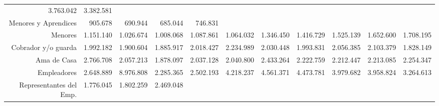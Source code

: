 \begin{tabular}{lllllllllll}
  \multicolumn{1}{r}{3.763.042} &
  \multicolumn{1}{r}{3.382.581} \\
\multicolumn{1}{r}{Menores y Aprendices\hspace{1em}} &
  \multicolumn{1}{|r}{905.678} &
  \multicolumn{1}{r}{690.944} &
  \multicolumn{1}{r}{685.044} &
  \multicolumn{1}{r}{746.831} &
  \multicolumn{1}{r}{} &
  \multicolumn{1}{r}{} &
  \multicolumn{1}{r}{} &
  \multicolumn{1}{r}{} &
  \multicolumn{1}{r}{} &
  \multicolumn{1}{r}{} \\
\multicolumn{1}{r}{Menores\hspace{1em}} &
  \multicolumn{1}{|r}{1.151.140} &
  \multicolumn{1}{r}{1.026.674} &
  \multicolumn{1}{r}{1.008.068} &
  \multicolumn{1}{r}{1.087.861} &
  \multicolumn{1}{r}{1.064.032} &
  \multicolumn{1}{r}{1.346.450} &
  \multicolumn{1}{r}{1.416.729} &
  \multicolumn{1}{r}{1.525.139} &
  \multicolumn{1}{r}{1.652.600} &
  \multicolumn{1}{r}{1.708.195} \\
\multicolumn{1}{r}{Cobrador y/o guarda\hspace{1em}} &
  \multicolumn{1}{|r}{1.992.182} &
  \multicolumn{1}{r}{1.900.604} &
  \multicolumn{1}{r}{1.885.917} &
  \multicolumn{1}{r}{2.018.427} &
  \multicolumn{1}{r}{2.234.989} &
  \multicolumn{1}{r}{2.030.448} &
  \multicolumn{1}{r}{1.993.831} &
  \multicolumn{1}{r}{2.056.385} &
  \multicolumn{1}{r}{2.103.379} &
  \multicolumn{1}{r}{1.828.149} \\
\multicolumn{1}{r}{Ama de Casa\hspace{1em}} &
  \multicolumn{1}{|r}{2.766.708} &
  \multicolumn{1}{r}{2.057.213} &
  \multicolumn{1}{r}{1.878.097} &
  \multicolumn{1}{r}{2.037.128} &
  \multicolumn{1}{r}{2.040.800} &
  \multicolumn{1}{r}{2.433.264} &
  \multicolumn{1}{r}{2.222.759} &
  \multicolumn{1}{r}{2.212.447} &
  \multicolumn{1}{r}{2.213.085} &
  \multicolumn{1}{r}{2.254.347} \\
\multicolumn{1}{r}{Empleadores\hspace{1em}} &
  \multicolumn{1}{|r}{2.648.889} &
  \multicolumn{1}{r}{8.976.808} &
  \multicolumn{1}{r}{2.285.365} &
  \multicolumn{1}{r}{2.502.193} &
  \multicolumn{1}{r}{4.218.237} &
  \multicolumn{1}{r}{4.561.371} &
  \multicolumn{1}{r}{4.473.781} &
  \multicolumn{1}{r}{3.979.682} &
  \multicolumn{1}{r}{3.958.824} &
  \multicolumn{1}{r}{3.264.613} \\
\multicolumn{1}{r}{Representantes del Emp.\hspace{1em}} &
  \multicolumn{1}{|r}{1.776.045} &
  \multicolumn{1}{r}{1.802.259} &
  \multicolumn{1}{r}{2.469.048} &

\end{tabular}
